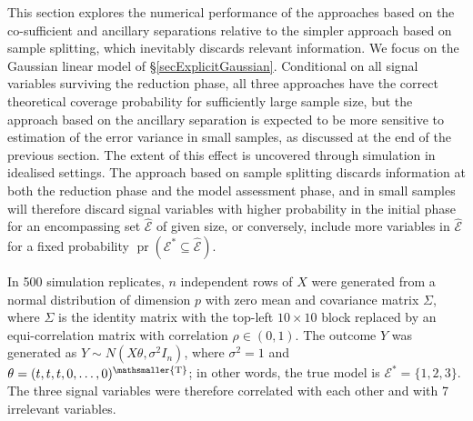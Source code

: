 \documentclass[10pt, reqno]{amsart}
\numberwithin{equation}{section}
\newcommand{\pr}{\mathop{\mathrm{pr}}}
\newcommand{\T}{{\mathsmaller {\rm T}}}
\begin{document}
This section explores the numerical performance of the approaches based on the co-sufficient and ancillary separations relative to the simpler approach based on sample splitting, which inevitably discards relevant information. We focus on the Gaussian linear model of \S \ref{secExplicitGaussian}. Conditional on all signal variables surviving the reduction phase, all three approaches have the correct theoretical coverage probability for sufficiently large sample size, but the approach based on the ancillary separation is expected to be more sensitive to estimation of the error variance in small samples, as discussed at the end of the previous section. The extent of this effect is uncovered through simulation in idealised settings. The approach based on sample splitting discards information at both the reduction phase and the model assessment phase, and in small samples will therefore discard signal variables with higher probability in the initial phase for an encompassing set $\hat{\mathcal{E}}$ of given size, or conversely, include more variables in $\hat{\mathcal{E}}$ for a fixed probability $\pr(\mathcal{E}^* \subseteq \hat{\mathcal{E}})$. 

In 500 simulation replicates, $n$ independent rows of $X$ were generated from a normal distribution of dimension $p$ with zero mean and covariance matrix $\Sigma$,  where $\Sigma$ is the identity matrix with the top-left $10\times 10$ block replaced by an equi-correlation matrix with correlation $\rho \in (0, 1)$. The outcome $Y$ was generated as $Y\sim N(X\theta, \sigma^2 I_n)$, where $\sigma^2=1$ and $\theta=(t,t,t,0,\ldots,0)^\T$; in other words, the true model is $\mathcal{E}^*=\{1,2,3\}$.  The three signal variables were therefore correlated with each other and with 7 irrelevant variables.
\end{document}
